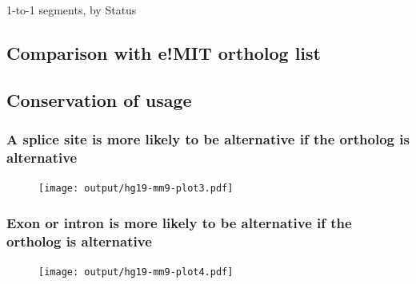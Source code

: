 \documentclass{article}
\begin{document}
\begin{table}[h!]
\begin{center}

\caption{1-to-1 segments, by Status}
\end{center}
\end{table}
\clearpage


\subsection{Comparison with e!MIT ortholog list}


\clearpage

\subsection{Conservation of usage}
\subsubsection{A splice site is more likely to be alternative if the ortholog is alternative}
\begin{figure}[h!]
\begin{center}
\texttt{[image: output/hg19-mm9-plot3.pdf]}
\end{center}
\end{figure}

\subsubsection{Exon or intron is more likely to be alternative if the ortholog is alternative}
\begin{figure}[h!]
\begin{center}
\texttt{[image: output/hg19-mm9-plot4.pdf]}
\end{center}
\end{figure}
\clearpage


\newcommand{\diagram}[5]{%
\begin{figure}[h!]
\begin{center}
\subfigure[]{\texttt{[image: \#1]}}%
\subfigure[]{\texttt{[image: \#1]}}%
\subfigure[]{\texttt{[image: \#1]}}
\caption{#5}
\end{center}
\end{figure}
}
\end{document}
